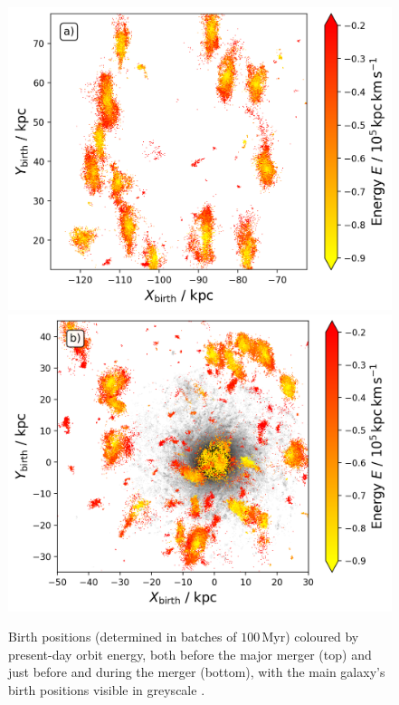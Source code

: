 \documentclass[fleqn,usenatbib]{mnras}
\begin{document}
\begin{figure}
    \centering
    \includegraphics[width=\columnwidth]{figures/fellowship.png}
    \includegraphics[width=\columnwidth]{figures/mount_doom.png}
    \caption{Birth positions (determined in batches of $100\,\mathrm{Myr}$) coloured by present-day orbit energy, both before the major merger (top) and just before and during the merger (bottom), with the main galaxy's birth positions visible in greyscale \href{https://github.com/svenbuder/gse_nihaouhd/tree/main/figures}{\faGithub}.}
    \label{fig:fellowship_and_mount_doom}
\end{figure}
\end{document}
